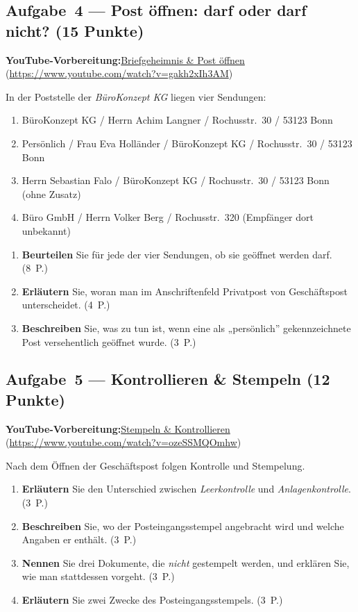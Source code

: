 \documentclass[11pt, a4paper]{article}
\begin{document}
\subsection*{Aufgabe~4 --- Post öffnen: darf oder darf nicht? (15 Punkte)}

\noindent\textbf{\color{bfwAccent}YouTube-Vorbereitung:}\enspace \href{https://www.youtube.com/watch?v=gakh2xIh3AM}{Briefgeheimnis \& Post öffnen} (\url{https://www.youtube.com/watch?v=gakh2xIh3AM})

\medskip
In der Poststelle der \emph{BüroKonzept KG} liegen vier Sendungen:

\begin{enumerate}[label=\arabic*., leftmargin=*]
  \item BüroKonzept KG / Herrn Achim Langner / Rochusstr.\ 30 / 53123 Bonn
  \item Persönlich / Frau Eva Holländer / BüroKonzept KG / Rochusstr.\ 30 / 53123 Bonn
  \item Herrn Sebastian Falo / BüroKonzept KG / Rochusstr.\ 30 / 53123 Bonn (ohne Zusatz)
  \item Büro GmbH / Herrn Volker Berg / Rochusstr.\ 320 (Empfänger dort unbekannt)
\end{enumerate}

\begin{enumerate}[label=(\alph*)]
  \item \textbf{Beurteilen} Sie für jede der vier Sendungen, ob sie geöffnet werden darf. \hfill (8~P.)
  \item \textbf{Erläutern} Sie, woran man im Anschriftenfeld Privatpost von Geschäftspost unterscheidet. \hfill (4~P.)
  \item \textbf{Beschreiben} Sie, was zu tun ist, wenn eine als „persönlich” gekennzeichnete Post versehentlich geöffnet wurde. \hfill (3~P.)
\end{enumerate}

\subsection*{Aufgabe~5 --- Kontrollieren \& Stempeln (12 Punkte)}

\noindent\textbf{\color{bfwAccent}YouTube-Vorbereitung:}\enspace \href{https://www.youtube.com/watch?v=ozeSSMQOmhw}{Stempeln \& Kontrollieren} (\url{https://www.youtube.com/watch?v=ozeSSMQOmhw})

\medskip
Nach dem Öffnen der Geschäftspost folgen Kontrolle und Stempelung.

\begin{enumerate}[label=(\alph*)]
  \item \textbf{Erläutern} Sie den Unterschied zwischen \emph{Leerkontrolle} und \emph{Anlagenkontrolle}. \hfill (3~P.)
  \item \textbf{Beschreiben} Sie, wo der Posteingangsstempel angebracht wird und welche Angaben er enthält. \hfill (3~P.)
  \item \textbf{Nennen} Sie drei Dokumente, die \emph{nicht} gestempelt werden, und erklären Sie, wie man stattdessen vorgeht. \hfill (3~P.)
  \item \textbf{Erläutern} Sie zwei Zwecke des Posteingangsstempels. \hfill (3~P.)
\end{enumerate}
\end{document}

